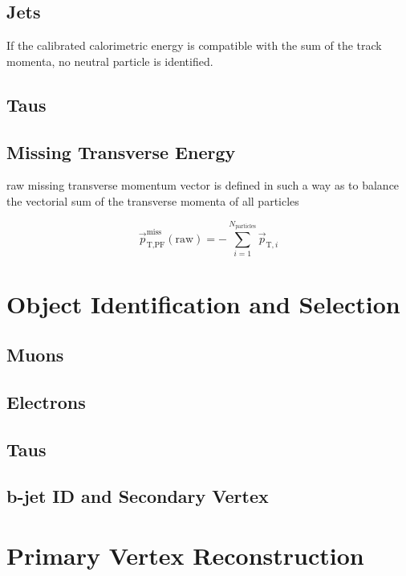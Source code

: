 \subsection{Jets}

If the calibrated calorimetric energy is compatible with the sum of the track momenta, no neutral particle is identified.



\subsection{Taus}
\subsection{Missing Transverse Energy}

raw missing transverse momentum vector is defined in such a way as to balance the vectorial sum of the transverse momenta of all particles

\begin{equation}
\vec{p}^{\text{miss}}_{\text{T,PF}}(\text{raw}) = - \sum^{N_{\text{particles}}}_{i=1} \vec{p}_{\text{T},i}
\end{equation}

\pagebreak
\section{Object Identification and Selection}
\subsection{Muons}
\subsection{Electrons}
\subsection{Taus}
\subsection{b-jet ID and Secondary Vertex}

\section{Primary Vertex Reconstruction}




